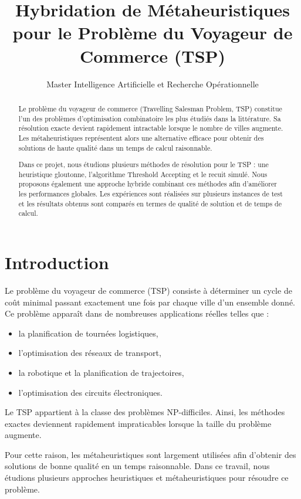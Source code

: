 \documentclass[11pt,a4paper]{article}
\title{Hybridation de Métaheuristiques pour le Problème du Voyageur de Commerce (TSP)}
\author{Master Intelligence Artificielle et Recherche Opérationnelle}
\begin{document}
\maketitle

\begin{abstract}

Le problème du voyageur de commerce (Travelling Salesman Problem, TSP) constitue
l’un des problèmes d’optimisation combinatoire les plus étudiés dans la littérature.
Sa résolution exacte devient rapidement intractable lorsque le nombre de villes
augmente. Les métaheuristiques représentent alors une alternative efficace pour
obtenir des solutions de haute qualité dans un temps de calcul raisonnable.

Dans ce projet, nous étudions plusieurs méthodes de résolution pour le TSP :
une heuristique gloutonne, l’algorithme Threshold Accepting et le recuit simulé.
Nous proposons également une approche hybride combinant ces méthodes afin
d’améliorer les performances globales. Les expériences sont réalisées sur
plusieurs instances de test et les résultats obtenus sont comparés en termes
de qualité de solution et de temps de calcul.

\end{abstract}

\section{Introduction}

Le problème du voyageur de commerce (TSP) consiste à déterminer un cycle de coût
minimal passant exactement une fois par chaque ville d’un ensemble donné.
Ce problème apparaît dans de nombreuses applications réelles telles que :

\begin{itemize}
\item la planification de tournées logistiques,
\item l’optimisation des réseaux de transport,
\item la robotique et la planification de trajectoires,
\item l’optimisation des circuits électroniques.
\end{itemize}

Le TSP appartient à la classe des problèmes NP-difficiles.
Ainsi, les méthodes exactes deviennent rapidement impraticables
lorsque la taille du problème augmente.

Pour cette raison, les métaheuristiques sont largement utilisées
afin d’obtenir des solutions de bonne qualité en un temps raisonnable.
Dans ce travail, nous étudions plusieurs approches heuristiques et
métaheuristiques pour résoudre ce problème.
\end{document}
